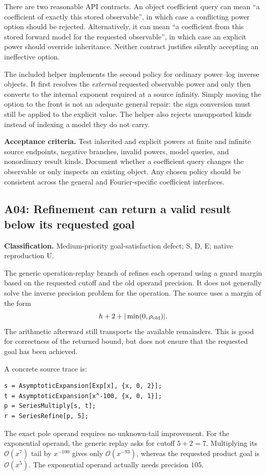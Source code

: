 \documentclass[11pt,a4paper]{article}
\newcommand{\code}[1]{\texttt{\detokenize{#1}}}
\newcommand{\OO}{\mathcal O}
\newcommand{\finding}[3]{\subsection{#1: #2}\textbf{Classification.} #3\par}
\begin{document}
There are two reasonable API contracts. An object coefficient query can
mean ``a coefficient of exactly this stored observable'', in which case a
conflicting power option should be rejected. Alternatively, it can mean
``a coefficient from this stored forward model for the requested
observable'', in which case an explicit power should override inheritance.
Neither contract justifies silently accepting an ineffective option.

The included helper \code{InverseCoefficientForPower} implements the
second policy for ordinary power--log inverse objects. It first resolves
the \emph{external} requested observable power and only then converts to
the internal exponent required at a source infinity. Simply moving the
option to the front is not an adequate general repair: the sign conversion
must still be applied to the explicit value. The helper also rejects
unsupported kinds instead of indexing a model they do not carry.

\textbf{Acceptance criteria.} Test inherited and explicit powers at finite
and infinite source endpoints, negative branches, invalid powers, model
queries, and nonordinary result kinds. Document whether a coefficient query
changes the observable or only inspects an existing object. Any chosen
policy should be consistent across the general and Fourier-specific
coefficient interfaces.

\finding{A04}{Refinement can return a valid result below its requested goal}{Medium-priority goal-satisfaction defect; S, D, E; native reproduction U.}
The generic operation-replay branch of \code{SeriesRefine} refines each
operand using a guard margin based on the requested cutoff and the old
operand precision. It does not generally solve the inverse precision
problem for the operation. The source uses a margin of the form
\[
 h+2+|\min(0,\rho_{\rm old})|.
\]
The arithmetic afterward still transports the available remainders. This
is good for correctness of the returned bound, but does not ensure that the
requested goal has been achieved.
\cite{seriesops}

A concrete source trace is:
\begin{lstlisting}
s = AsymptoticExpansion[Exp[x], {x, 0, 2}];
t = AsymptoticExpansion[x^-100, {x, 0, 1}];
p = SeriesMultiply[s, t];
r = SeriesRefine[p, 5];
\end{lstlisting}
The exact pole operand requires no unknown-tail improvement. For the
exponential operand, the generic replay asks for cutoff $5+2=7$. Multiplying
its $\OO(x^7)$ tail by $x^{-100}$ gives only $\OO(x^{-93})$, whereas the
requested product goal is $\OO(x^5)$. The exponential operand actually needs
precision $105$.
\end{document}
